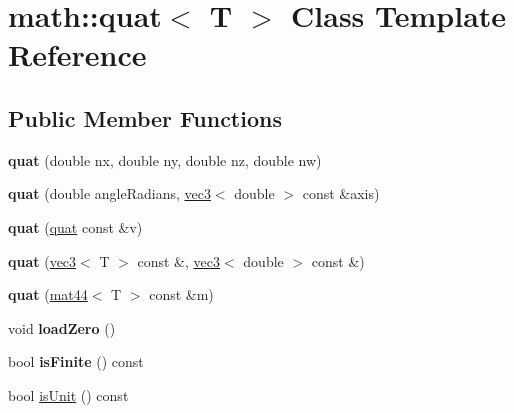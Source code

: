 \hypertarget{classmath_1_1quat}{
\section{math::quat$<$ T $>$ Class Template Reference}
\label{classmath_1_1quat}
}
\subsection*{Public Member Functions}
\begin{DoxyCompactItemize}
\item 
\hypertarget{classmath_1_1quat_a3040f78fd23f37058062127dfee7d86b}{
{\bfseries quat} (double nx, double ny, double nz, double nw)}
\label{classmath_1_1quat_a3040f78fd23f37058062127dfee7d86b}

\item 
\hypertarget{classmath_1_1quat_ab60827cbd63dbc074028aa8efb4c1d35}{
{\bfseries quat} (double angleRadians, \hyperlink{classmath_1_1vec3}{vec3}$<$ double $>$ const \&axis)}
\label{classmath_1_1quat_ab60827cbd63dbc074028aa8efb4c1d35}

\item 
\hypertarget{classmath_1_1quat_a50c3ea09c2b0fab1ef18bb4f8ba0046f}{
{\bfseries quat} (\hyperlink{classmath_1_1quat}{quat} const \&v)}
\label{classmath_1_1quat_a50c3ea09c2b0fab1ef18bb4f8ba0046f}

\item 
\hypertarget{classmath_1_1quat_a6cd99ea6efabba81b98a0fbd2c4e2807}{
{\bfseries quat} (\hyperlink{classmath_1_1vec3}{vec3}$<$ T $>$ const \&, \hyperlink{classmath_1_1vec3}{vec3}$<$ double $>$ const \&)}
\label{classmath_1_1quat_a6cd99ea6efabba81b98a0fbd2c4e2807}

\item 
\hypertarget{classmath_1_1quat_aa0bfec26e0c12bebd828a6a0b22e8607}{
{\bfseries quat} (\hyperlink{classmath_1_1mat44}{mat44}$<$ T $>$ const \&m)}
\label{classmath_1_1quat_aa0bfec26e0c12bebd828a6a0b22e8607}

\item 
\hypertarget{classmath_1_1quat_a717257da12352869f790b9917c2b702b}{
void {\bfseries loadZero} ()}
\label{classmath_1_1quat_a717257da12352869f790b9917c2b702b}

\item 
\hypertarget{classmath_1_1quat_affa82799e59b2c74a7c9f1dd460ed6f9}{
bool {\bfseries isFinite} () const }
\label{classmath_1_1quat_affa82799e59b2c74a7c9f1dd460ed6f9}

\item 
\hypertarget{classmath_1_1quat_a2df407abaadb9e9ac174bc7cca1894f6}{
bool \hyperlink{classmath_1_1quat_a2df407abaadb9e9ac174bc7cca1894f6}{isUnit} () const }
\label{classmath_1_1quat_a2df407abaadb9e9ac174bc7cca1894f6}


\end{DoxyCompactItemize}
